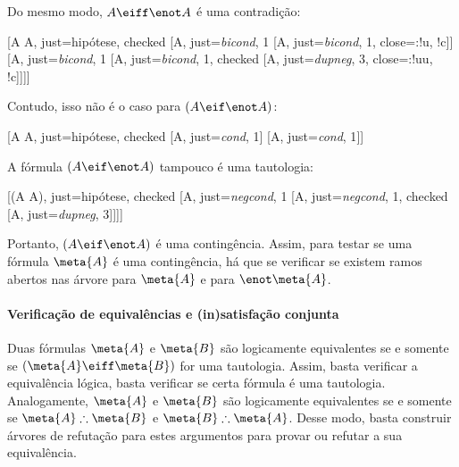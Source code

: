 Do mesmo modo,  $A \eiff \enot A$ é uma contradição:

\begin{center}
	\begin{tableau}
		{
		}
		[A \eiff \enot A, just=hipótese, checked
			[A, just={\emph{bicond}, 1}
				[\enot A, just={\emph{bicond}, 1}, close={:!u, !c}]]
			[\enot A, just={\emph{bicond}, 1}
				[\enot \enot A, just={\emph{bicond}, 1}, checked
				[A, just={\emph{dupneg}, 3}, close={:!uu, !c}]]]]
	\end{tableau}
\end{center}

Contudo, isso não é o caso para $(A \eif \enot A)$:

\begin{center}
	\begin{tableau}
		{
		}
		[A \eif \enot A, just=hipótese, checked
		[A, just={\emph{cond}, 1}]
		[\enot A, just={\emph{cond}, 1}]]
	\end{tableau}
\end{center}

A fórmula $(A \eif \enot A)$ tampouco é uma tautologia:

	\begin{center}
	\begin{tableau}
		{
		}
		[\enot(A \eif \enot A), just=hipótese, checked
		[A, just={\emph{negcond}, 1}
		[\enot \enot A, just={\emph{negcond}, 1}, checked
		[A, just={\emph{dupneg}, 3}]]]]
	\end{tableau}
\end{center}

Portanto, $(A \eif \enot A)$ é uma contingência. 
Assim, para testar se uma fórmula $\meta{A}$ é uma contingência, há que se verificar se existem ramos abertos nas árvore para $\meta{A}$ e para $\enot\meta{A}$.

\paragraph{Verificação de equivalências e (in)satisfação conjunta}

Duas fórmulas $\meta{A}$ e $\meta{B}$ são logicamente equivalentes se e somente se $(\meta{A} \eiff \meta{B})$ for uma tautologia. 
Assim, basta verificar a equivalência lógica, basta verificar se certa fórmula é uma tautologia.
Analogamente,  $\meta{A}$ e $\meta{B}$ são logicamente equivalentes se e somente se $\meta{A} \therefore \meta{B}$ e $\meta{B} \therefore \meta{A}$.
Desse modo, basta construir árvores de refutação para estes argumentos para provar ou refutar a sua equivalência.

